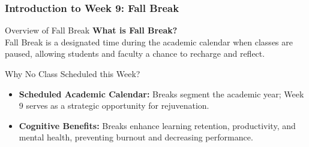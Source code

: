 \documentclass[aspectratio=169]{beamer}
\begin{document}
\frame{\titlepage}

\begin{frame}[fragile]
    \frametitle{Introduction to Week 9: Fall Break}
    \begin{block}{Overview of Fall Break}
        \textbf{What is Fall Break?} \\
        Fall Break is a designated time during the academic calendar when classes are paused, allowing students and faculty a chance to recharge and reflect.
    \end{block}
    \begin{block}{Why No Class Scheduled this Week?}
        \begin{itemize}
            \item \textbf{Scheduled Academic Calendar:} Breaks segment the academic year; Week 9 serves as a strategic opportunity for rejuvenation.
            \item \textbf{Cognitive Benefits:} Breaks enhance learning retention, productivity, and mental health, preventing burnout and decreasing performance.
        \end{itemize}
    \end{block}
\end{frame}
\end{document}
